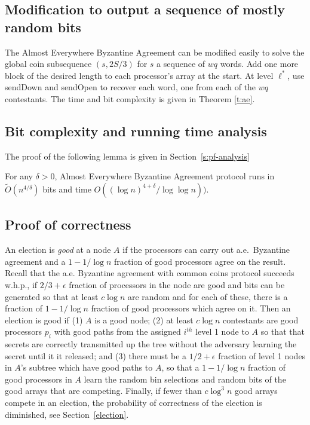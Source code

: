 \documentclass{sig-alternate}
\begin{document}
\subsection{Modification to output a sequence of mostly random bits}\label{GCS}

The Almost Everywhere Byzantine Agreement can be modified easily to solve the global coin subsequence $(s,2S/3)$ for $s$ a sequence of $wq$ words.  Add one more block of the desired length to each processor's array at the start. At level $\ell^*$, use sendDown and sendOpen to recover each word, one from each of the $wq$ contestants. The time and bit complexity is given in Theorem \ref{t:ae}. 

\subsection{Bit complexity and running time analysis}\label{analysis}

The proof of the following lemma is given in Section~\ref{s:pf-analysis}

\begin{lemma}\label{l:analysis}
For any $\delta >0$, Almost Everywhere Byzantine Agreement protocol runs in $\tilde{O}(n^{4/\delta}) $ bits  and time $O((\log n)^{4 + \delta} / \log \log n) )$.
\end{lemma}


\subsection{Proof of correctness}\label{correct}

An election is {\it good}  at a node $A$  if the processors can carry out  a.e.\ Byzantine agreement and a $1-1/\log n$ fraction of good processors agree on the result. Recall that the a.e. Byzantine agreement with common coins protocol succeeds w.h.p., if $2/3+\epsilon $ fraction of processors in the node are good
and bits can be generated so that at least $c\log n$ are random and for each of these, there is a fraction of $1-1/\log n$ fraction of good processors which agree on it. 
Then an election is good if  (1) $A$ is a good node; (2) at least $c\log n$ contestants are good processors $p_i$ with good paths from 
the assigned $i^{th}$ level 1 node to  $A$ so that that secrets are correctly transmitted up the tree without the adversary learning the secret until it it released; and (3) there must be a $1/2 + \epsilon$ fraction of level 1 nodes in $A$'s subtree which have good paths to $A$, so that a $1-1/\log n$ fraction of good processors in $A$ learn the random bin selections and random bits of the good arrays that are competing.  Finally, if fewer than $c \log^3 n$ good arrays compete in an election, the probability of correctness of the election is diminished, see Section~\ref{election}. 
  
\end{document}
